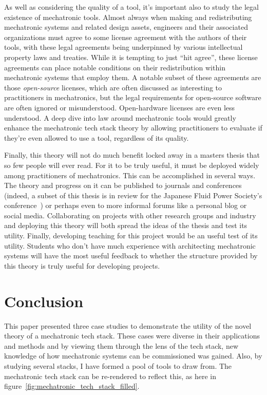 \documentclass[english,12pt,a4paper,pdftex,eng,utf8]{aaltothesis}
\begin{document}
As well as considering the quality of a tool, it's important also to study the legal existence of mechatronic tools.  Almost always when making and redistributing mechatronic systems and related design assets, engineers and their associated organizations must agree to some license agreement with the authors of their tools, with these legal agreements being underpinned by various intellectual property laws and treaties.  While it is tempting to just ``hit agree'', these license agreements can place notable conditions on their redistribution within mechatronic systems that employ them.  A notable subset of these agreements are those \textit{open-source} licenses, which are often discussed as interesting to practitioners in mechatronics, but the legal requirements for open-source software are often ignored or misunderstood.  Open-hardware licenses are even less understood.  A deep dive into law around mechatronic tools would greatly enhance the mechatronic tech stack theory by allowing practitioners to evaluate if they're even allowed to use a tool, regardless of its quality.

Finally, this theory will not do much benefit locked away in a masters thesis that so few people will ever read.  For it to be truly useful, it must be deployed widely among practitioners of mechatronics.  This can be accomplished in several ways.  The theory and progress on it can be published to journals and conferences (indeed, a subset of this thesis is in review for the Japanese Fluid Power Society's conference~\cite{Porter2024}) or perhaps even to more informal forums like a personal blog or social media.  Collaborating on projects with other research groups and industry and deploying this theory will both spread the ideas of the thesis and test its utility.  Finally, developing teaching for this project would be an useful test of its utility.  Students who don't have much experience with architecting mechatronic systems will have the most useful feedback to whether the structure provided by this theory is truly useful for developing projects.

\clearpage


\section{Conclusion}

This paper presented three case studies to demonstrate the utility of the novel theory of a mechatronic tech stack. These cases were diverse in their applications and methods and by viewing them through the lens of the tech stack, new knowledge of how mechatronic systems can be commissioned was gained. Also, by studying several stacks, I have formed a pool of tools to draw from. The mechatronic tech stack can be re-rendered to reflect this, as here in figure~\ref{fig:mechatronic_tech_stack_filled}.
\end{document}
